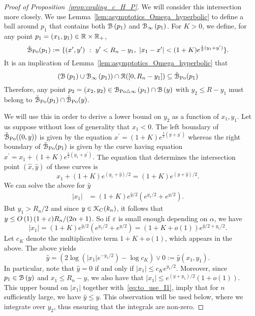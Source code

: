 \begin{proof}[Proof of Proposition~\ref{prop:couling_c_H_P}]
We will consider this intersection more closely. We use Lemma~\ref{lem:asymptotics_Omega_hyperbolic} to define a ball around $p_1$ that contains both 
${\mathcal B}\left(p_1\right)$ and ${\mathcal B}_{\infty}\left(p_1\right)$.
For $K > 0$, we define, for any point $p_1=(x_1,y_1) \in {\ensuremath{\mathbb R}} \times {\ensuremath{\mathbb R}}_+$,
\begin{equation}\label{eq:def_fatball}
	\check{{\mathcal B}}_{{\mathrm{Po}}}(p_1) : = \{ (x',y') \ : \  y' < R_n - y_1, \ | x_1 - x'| < (1+K) e^{\frac{1}{2} (y_1 + y')}  \}.
\end{equation}
It is an implication of Lemma~\ref{lem:asymptotics_Omega_hyperbolic}  that 
\begin{equation*} %
(\BallHyp{p_1} \cup \BallPo{p_1}) \cap \Rcal([0, R_n - y_1]) \subseteq \FatBallHyp{p_1}
\end{equation*}
Therefore, any point $p_2 = (x_2,y_2) \in {\mathcal B}_{{\mathrm{Po}} \bigtriangleup \infty}\left(p_1\right) \cap {\mathcal B}\left(y\right)$ with 
$y_2 \leq R-y_1$ must belong to $\check{{\mathcal B}}_{{\mathrm{Po}}}(p_1) \cap \check{{\mathcal B}}_{{\mathrm{Po}}}(y)$.

We will use this in order to derive a lower bound on $y_2$ as a function of $x_1, y_1$. 
Let us suppose without loss of generality that $x_1 < 0$. 
The left boundary of $\check{{\mathcal B}}_{{\mathrm{Po}}}((0,y))$ is given by the equation 
$x^\prime = (1+K)e^{\frac{1}{2} (y + y^\prime)}$ whereas the right boundary of $\check{{\mathcal B}}_{{\mathrm{Po}}}(p_1)$ is given by the curve having equation $x^\prime = x_1 + (1+ K)e^{\frac{1}{2} (y_1 + y^\prime)}.$
The equation that determines the intersection point $(\hat{x},\hat{y})$ of these curves  is
\[
	x_1 + (1+K)e^{(y_1 + \hat{y})/2}= (1+K) e^{(y + \hat{y})/2}.
\]
We can solve the above for $\hat{y}$  
\begin{equation*} 
\begin{split}
|x_1| &=(1+K) e^{\hat{y}/2} \left( e^{y_1/2} + e^{y/2} \right).
\end{split}
\end{equation*}
But $y_1 > R_n/2$ and since $y \in {\mathcal K}_{C}(k_n)$, it follows that $y \le O\left(1\right)(1+\varepsilon) R_n /(2\alpha +1)$. So if $\varepsilon$ is small enough depending on $\alpha$, we have 
$$ |x_1| =(1+K) e^{\hat{y}/2} \left( e^{y_1/2} + e^{y/2} \right) = (1+K+o(1))e^{\hat{y}/2 + y_1/2}. $$
Let $c_K$ denote the multiplicative term $1+ K+o(1)$, which appears in the above.
The above yields
\begin{equation} \label{eq:to_use_I1}
\hat{y}= \left(2 \log(|x_1|e^{-y_1/2}) - \log c_K \right) \vee 0 := \hat{y}(x_1,y_1). 
\end{equation}
In particular, note that $\hat{y} = 0$ if and only if $|x_1| \leq c_K e^{y_1/2}$.  
Moreover, since $p_1 \in {\mathcal B}\left(y\right)$ and $x_1 \leq R_n - y$, we also have that 
$|x_1| \leq e^{(y+y_1)/2} (1+o(1))$. This upper bound on $|x_1|$ together with~\eqref{eq:to_use_I1}, imply that for $n$ sufficiently large, we have $\hat{y} \leq y$. This observation will be used below, where 
we integrate over $y_2$, thus ensuring that the integrals are non-zero. 


\end{proof}
